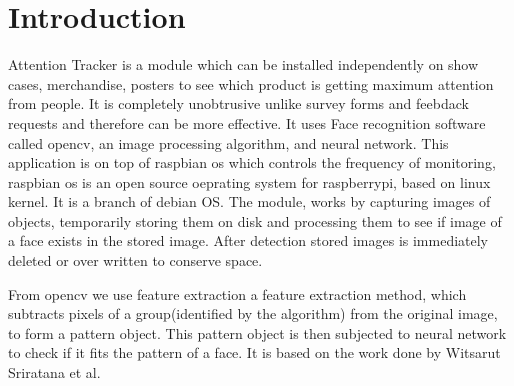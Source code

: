\section{Introduction}
Attention Tracker is a module which can be installed independently on show cases, merchandise, posters to see which product is getting maximum attention from people. It is completely unobtrusive unlike survey forms and feebdack requests and therefore can be more effective. It uses Face recognition software called opencv, an image processing algorithm, and neural network. This application is on top of
raspbian os which controls the frequency of monitoring, raspbian os is an open source oeprating system for raspberrypi, based on linux kernel. It is a branch of debian OS. The module, works by capturing images of objects, temporarily storing them on disk and processing them to see if image of a face exists in the stored image. After detection stored images is immediately deleted or over written to conserve space. 

From opencv we use feature extraction a feature extraction method, which subtracts pixels of a group(identified by the algorithm) from
the original image, to form a pattern object. This pattern object is then subjected to neural network to check if it fits the pattern of a face. It is based on the work done by Witsarut Sriratana et al\cite{8434429}.
